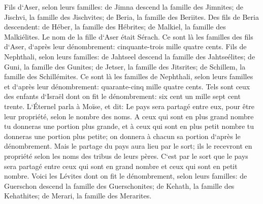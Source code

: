 \verse Fils d`Aser, selon leurs familles: de Jimna descend la famille des Jimnites; de Jischvi, la famille des Jischvites; de Beria, la famille des Beriites. 
\verse Des fils de Beria descendent: de Héber, la famille des Hébrites; de Malkiel, la famille des Malkiélites. 
\verse Le nom de la fille d`Aser était Sérach. 
\verse Ce sont là les familles des fils d`Aser, d`après leur dénombrement: cinquante-trois mille quatre cents. 
\verse Fils de Nephthali, selon leurs familles: de Jahtseel descend la famille des Jahtseélites; de Guni, la famille des Gunites; 
\verse de Jetser, la famille des Jitsrites; de Schillem, la famille des Schillémites. 
\verse Ce sont là les familles de Nephthali, selon leurs familles et d`après leur dénombrement: quarante-cinq mille quatre cents. 
\verse Tels sont ceux des enfants d`Israël dont on fit le dénombrement: six cent un mille sept cent trente. 
\verse L`Éternel parla à Moïse, et dit: 
\verse Le pays sera partagé entre eux, pour être leur propriété, selon le nombre des noms. 
\verse A ceux qui sont en plus grand nombre tu donneras une portion plus grande, et à ceux qui sont en plus petit nombre tu donneras une portion plus petite; on donnera à chacun sa portion d`après le dénombrement. 
\verse Mais le partage du pays aura lieu par le sort; ils le recevront en propriété selon les noms des tribus de leurs pères. 
\verse C`est par le sort que le pays sera partagé entre ceux qui sont en grand nombre et ceux qui sont en petit nombre. 
\verse Voici les Lévites dont on fit le dénombrement, selon leurs familles: de Guerschon descend la famille des Guerschonites; de Kehath, la famille des Kehathites; de Merari, la famille des Merarites. 
